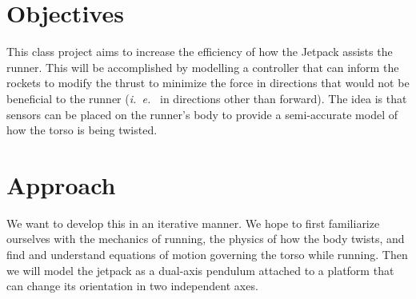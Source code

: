 \documentclass[12pt, twocolumn]{article}
\begin{document}
\section{Objectives}

This class
project aims to increase the efficiency of how the Jetpack assists the runner.
This will be accomplished by 
modelling a controller that can inform  the rockets to
modify the thrust to minimize the force in 
directions that would not be beneficial to the runner (\emph{i.~e.~}
in directions other than forward).
The idea is that sensors can be placed on the runner's body to provide
a semi-accurate model of how the torso is being twisted.  




\section{Approach}

We want to develop this in an iterative manner.  We hope to first
familiarize ourselves with the mechanics of running, the physics of
how the body twists, and find and understand equations of motion
governing the torso while running.
Then we will model the jetpack as a dual-axis pendulum attached to a
platform that can change its orientation in two independent axes.











% 
\end{document}
